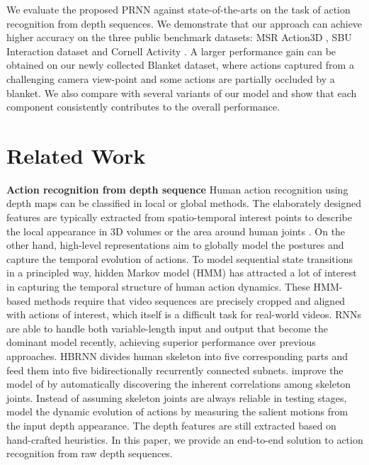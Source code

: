 \documentclass[10pt,twocolumn,letterpaper]{article}
\begin{document}
We evaluate the proposed PRNN against state-of-the-arts on the task of action recognition from depth sequences. We demonstrate that our approach can achieve higher accuracy on the three public benchmark datasets: MSR Action3D \cite{Wanqing_cvprw_2010}, SBU Interaction dataset \cite{kiwon_cvprw_2012} and Cornell Activity \cite{sung_rgbdactivity_2012}. A larger performance gain can be obtained on our newly collected Blanket dataset, where actions captured from a challenging camera view-point and some actions are partially occluded by a blanket. We also compare with several variants of our model and show that each component consistently contributes to the overall performance.




\section{Related Work}

\noindent \textbf{Action recognition from depth sequence} Human action recognition using depth maps can be classified in local or global methods. The elaborately designed features \cite{Wanqing_cvprw_2010,Jiang_tpami_2014,Omar_cvpr_2013} are typically extracted from spatio-temporal interest points to describe the local appearance in 3D volumes or the area around human joints \cite{Gowayyed_IJCAI_2013}. On the other hand, high-level representations \cite{Xiaodong_2014_cvpr} aim to globally model the postures and capture the temporal evolution of actions. To model sequential state transitions in a principled way, hidden Markov model (HMM) has attracted a lot of interest \cite{gong_tpami_2014} in capturing the temporal structure of human action dynamics. These HMM-based methods require that video sequences are precisely cropped and aligned with actions of interest, which itself is a difficult task for real-world videos. RNNs are able to handle both variable-length input and output that become the dominant model \cite{Veeriah_2015_ICCV,Yong_cvpr_2015,wentao_2016} recently, achieving superior performance over previous approaches. HBRNN \cite{Yong_cvpr_2015} divides human skeleton into five corresponding parts and feed them into five bidirectionally recurrently connected subnets. \cite{wentao_2016} improve the model of \cite{Yong_cvpr_2015} by automatically discovering the inherent correlations among skeleton joints. Instead of assuming skeleton joints are always reliable in testing stages, \cite{Veeriah_2015_ICCV} model the dynamic evolution of actions by measuring the salient motions from the input depth appearance. The depth features are still extracted based on hand-crafted heuristics. In this paper, we provide an end-to-end solution to action recognition from raw depth sequences.
\end{document}
